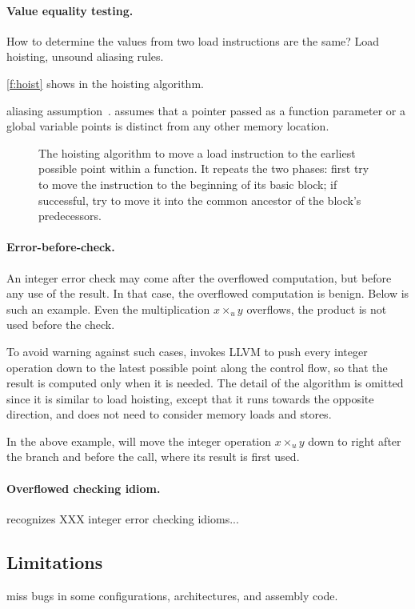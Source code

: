 \paragraph{Value equality testing.}
How to determine the values from two load instructions
are the same? Load hoisting, unsound aliasing rules.

\autoref{f:hoist} shows in the hoisting algorithm.

aliasing assumption~\cite{livshits:ipssa}.
\sys assumes that a pointer passed as a function parameter or a
global variable points is distinct from any other memory location.


\begin{figure}

\caption{The hoisting algorithm to move a load instruction to the
earliest possible point within a function.  It repeats the two
phases: first try to move the instruction to the beginning of its
basic block; if successful, try to move it into the common ancestor
of the block's predecessors.}
\label{f:hoist}
\end{figure}

\paragraph{Error-before-check.}
An integer error check may come after the overflowed computation,
but before any use of the result.  In that case, the overflowed
computation is benign.  Below is such an example.  Even the
multiplication $x \times_u y$ overflows, the product  is
not used before the check.


To avoid warning against such cases, \sys invokes LLVM to push every
integer operation down to the latest possible point along the control
flow, so that the result is computed only when it is needed.  The
detail of the algorithm is omitted since it is similar to load
hoisting, except that it runs towards the opposite direction, and
does not need to consider memory loads and stores.

In the above example, \sys will move the integer operation $x
\times_u y$ down to right after the  branch and before the
 call, where its result  is first used.

\paragraph{Overflowed checking idiom.}

\sys recognizes XXX integer error checking idioms...

\subsection{Limitations}

miss bugs in some configurations, architectures,
and assembly code.
